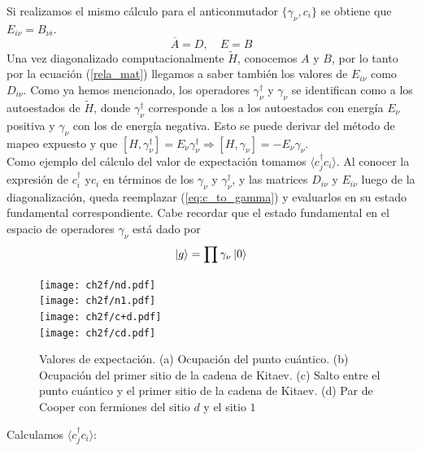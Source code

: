 Si realizamos el mismo c\'{a}lculo para el anticonmutador $\{\gamma_\nu,c_i\}$ se obtiene que $E_{i\nu}=B_{\nu i}$. 
\begin{equation}
    \overline{A}=D,\quad E=B
    \label{rela_mat}
\end{equation}
Una vez diagonalizado computacionalmente $\tilde H$, conocemos $A$ y $ B$, por lo tanto por la ecuaci\'{o}n (\ref{rela_mat}) llegamos a saber tambi\'{e}n los valores de $E_{i\nu}$ como $D_{i\nu}$. Como ya hemos mencionado, los operadores $\gamma^\dagger_\nu$ y $\gamma_\nu$ se identifican como a los autoestados de $\tilde H$, donde $\gamma^\dagger_\nu$ corresponde a los a los autoestados con energ\'{i}a $E_\nu$ positiva y $\gamma_\nu$ con los de energ\'{i}a negativa. Esto se puede derivar del m\'{e}todo de mapeo expuesto y que $[H,\gamma_\nu^\dagger]=E_\nu \gamma^\dagger_\nu \Rightarrow [H,\gamma_\nu]=-E_\nu \gamma_\nu$.\\
Como ejemplo del c\'{a}lculo del valor de expectaci\'{o}n tomamos $\langle c^\dagger_j c_i \rangle$. Al conocer la expresi\'{o}n de $c^\dagger_i$ y$c_i$ en t\'{e}rminos de los $\gamma_\nu$ y $\gamma_\nu^\dagger$, y las matrices $D_{i\nu}$ y $E_{i\nu}$ luego de la diagonalizaci\'{o}n, queda reemplazar (\ref{eq:c_to_gamma}) y evaluarlos en su estado fundamental correspondiente. Cabe recordar que el estado fundamental en el espacio de operadores $\gamma_\nu$ est\'{a} dado por
\begin{equation}
    \ket{g}=\prod \gamma_\nu \ket0
\end{equation}
%
%
%
\begin{figure}[H]
\begin{center}
\texttt{[image: ch2f/nd.pdf]}\\
\vspace{-1cm}
\texttt{[image: ch2f/n1.pdf]}\\
\vspace{-1cm}
\texttt{[image: ch2f/c+d.pdf]}\\
\vspace{-1cm}
\texttt{[image: ch2f/cd.pdf]}
\end{center}
\caption{Valores de expectaci\'{o}n. (a) Ocupaci\'{o}n del punto cu\'{a}ntico. (b) Ocupaci\'{o}n del primer sitio de la cadena de Kitaev. (c) Salto entre el punto cu\'{a}ntico y el primer sitio de la cadena de Kitaev. (d) Par de Cooper con fermiones del sitio $d$ y el sitio $1$ }
\label{exp_val}
\end{figure}
Calculamos $\langle c_j^\dagger c_i \rangle$:
